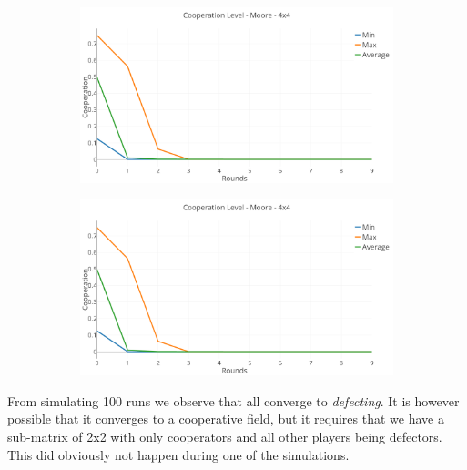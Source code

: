\documentclass[a4paper, 11pt]{article}
\begin{document}
\begin{figure}[H]
\begin{subfigure}{.75\textwidth}
	\includegraphics[width=1\linewidth]{PDMoore4x4}
\end{subfigure}

\begin{subfigure}{.75\textwidth}
	\includegraphics[width=1\linewidth]{PDMoore4x4}
\end{subfigure}

\end{figure}

	From simulating 100 runs we observe that all converge to \textit{defecting}. It is however possible that it converges to a cooperative field, but it requires that we have a sub-matrix of 2x2 with only cooperators and all other players being defectors. This did obviously not happen during one of the simulations.
\end{document}
